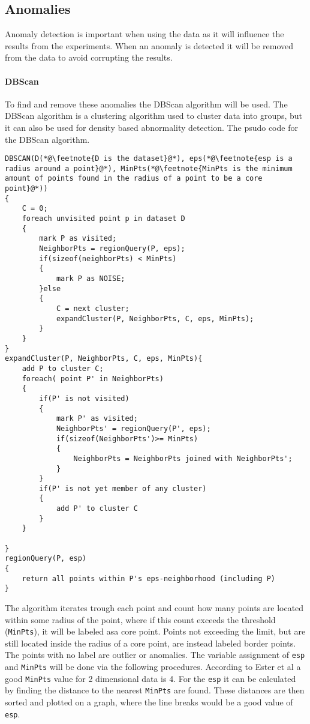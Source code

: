 \subsection{Anomalies}
Anomaly detection is important when using the data as it will influence the results from the experiments. When an anomaly is detected it will be removed from the data to avoid corrupting the results.
\paragraph{DBScan}
To find and remove these anomalies the DBScan algorithm will be used. The DBScan algorithm is a clustering algorithm used to cluster data into groups, but it can also be used for density based abnormality detection. The psudo code for the DBScan algorithm\cite{ester1996density}.
\begin{lstlisting}
DBSCAN(D(*@\feetnote{D is the dataset}@*), eps(*@\feetnote{esp is a radius around a point}@*), MinPts(*@\feetnote{MinPts is the minimum amount of points found in the radius of a point to be a core point}@*))
{
    C = 0;
    foreach unvisited point p in dataset D
    {
        mark P as visited;
        NeighborPts = regionQuery(P, eps);
        if(sizeof(neighborPts) < MinPts)
        {
            mark P as NOISE;
        }else
        {
            C = next cluster;
            expandCluster(P, NeighborPts, C, eps, MinPts);
        }
    }
}
expandCluster(P, NeighborPts, C, eps, MinPts){
    add P to cluster C;
    foreach( point P' in NeighborPts)
    {
        if(P' is not visited)
        {
            mark P' as visited;
            NeighborPts' = regionQuery(P', eps);
            if(sizeof(NeighborPts')>= MinPts)
            {
                NeighborPts = NeighborPts joined with NeighborPts';
            }
        }
        if(P' is not yet member of any cluster)
        {
            add P' to cluster C
        }
    }

}
regionQuery(P, esp)
{
    return all points within P's eps-neighborhood (including P)
}
\end{lstlisting}

The algorithm iterates trough each point and count how many points are located within some radius of the point, where if this count exceeds the threshold (\texttt{MinPts}), it will be labeled asa core point. Points not exceeding the limit, but are still located inside the radius of a core point, are instead labeled border points. The points with no label are outlier or anomalies. The variable assignment of \texttt{esp} and \texttt{MinPts} will be done via the following procedures. According to Ester et al\cite[]{ester1996density} a good \texttt{MinPts} value for 2 dimensional data is 4. For the \texttt{esp} it can be calculated by finding the distance to the nearest \texttt{MinPts} are found. These distances are then sorted and plotted on a graph, where the line breaks would be a good value of \texttt{esp}.


